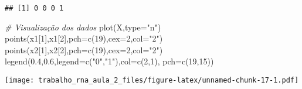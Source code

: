 \documentclass[
]{article}
\newenvironment{Shaded}{\begin{snugshade}}{\end{snugshade}}
\newcommand{\AttributeTok}[1]{\textcolor[rgb]{0.77,0.63,0.00}{#1}}
\newcommand{\CommentTok}[1]{\textcolor[rgb]{0.56,0.35,0.01}{\textit{#1}}}
\newcommand{\DecValTok}[1]{\textcolor[rgb]{0.00,0.00,0.81}{#1}}
\newcommand{\FloatTok}[1]{\textcolor[rgb]{0.00,0.00,0.81}{#1}}
\newcommand{\FunctionTok}[1]{\textcolor[rgb]{0.00,0.00,0.00}{#1}}
\newcommand{\NormalTok}[1]{#1}
\newcommand{\StringTok}[1]{\textcolor[rgb]{0.31,0.60,0.02}{#1}}
\begin{document}
\begin{verbatim}
## [1] 0 0 0 1
\end{verbatim}

\begin{Shaded}
\begin{Highlighting}[]
\CommentTok{\# Visualização dos dados}
\FunctionTok{plot}\NormalTok{(X,}\AttributeTok{type=}\StringTok{"n"}\NormalTok{)}
\FunctionTok{points}\NormalTok{(x1[}\DecValTok{1}\NormalTok{],x1[}\DecValTok{2}\NormalTok{],}\AttributeTok{pch=}\FunctionTok{c}\NormalTok{(}\DecValTok{19}\NormalTok{),}\AttributeTok{cex=}\DecValTok{2}\NormalTok{,}\AttributeTok{col=}\StringTok{"2"}\NormalTok{)}
\FunctionTok{points}\NormalTok{(x2[}\DecValTok{1}\NormalTok{],x2[}\DecValTok{2}\NormalTok{],}\AttributeTok{pch=}\FunctionTok{c}\NormalTok{(}\DecValTok{19}\NormalTok{),}\AttributeTok{cex=}\DecValTok{2}\NormalTok{,}\AttributeTok{col=}\StringTok{"2"}\NormalTok{)}
\FunctionTok{legend}\NormalTok{(}\FloatTok{0.4}\NormalTok{,}\FloatTok{0.6}\NormalTok{,}\AttributeTok{legend=}\FunctionTok{c}\NormalTok{(}\StringTok{"0"}\NormalTok{,}\StringTok{"1"}\NormalTok{),}\AttributeTok{col=}\FunctionTok{c}\NormalTok{(}\DecValTok{2}\NormalTok{,}\DecValTok{1}\NormalTok{), }\AttributeTok{pch=}\FunctionTok{c}\NormalTok{(}\DecValTok{19}\NormalTok{,}\DecValTok{15}\NormalTok{))}
\end{Highlighting}
\end{Shaded}

\texttt{[image: trabalho\_rna\_aula\_2\_files/figure-latex/unnamed-chunk-17-1.pdf]}
\end{document}
